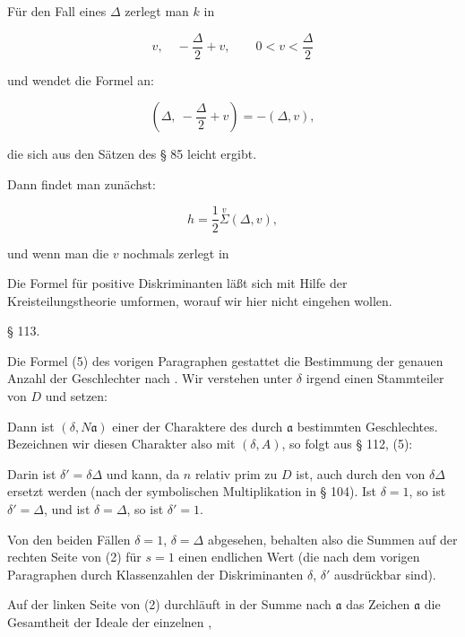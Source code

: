 Für den Fall eines  $\Delta$ zerlegt man $k$ in

\[
v, \quad -\frac{\Delta}{2} + v, \qquad 0 < v < \frac{\Delta}{2}
\]

und wendet die Formel an:

\[
\left(\Delta,\ -\frac{\Delta}{2} + v\right) = -(\Delta,v),
\]

die sich aus den Sätzen des § 85 leicht ergibt.

Dann findet man zunächst:

\[
h = \frac{1}{2}\overset{v}{\Sigma}(\Delta,v),
\]

und wenn man die $v$ nochmals zerlegt in


Die Formel für positive Diskriminanten läßt sich mit Hilfe
der Kreisteilungstheorie umformen, worauf wir hier nicht eingehen
wollen.

\begin{center}
§ 113.\quad {}
\end{center}

Die Formel (5) des vorigen Paragraphen gestattet die Bestimmung
 der genauen Anzahl der Geschlechter nach .
Wir verstehen unter $\delta$ irgend einen Stammteiler von $D$ und setzen:


Dann ist $(\delta,N\mathfrak{a})$ einer der Charaktere des durch $\mathfrak{a}$ bestimmten
Geschlechtes. Bezeichnen wir diesen Charakter also mit $(\delta,A)$,
so folgt aus § 112, (5):


Darin ist $\delta' = \delta\Delta$ und kann, da $n$ relativ prim zu $D$ ist,
auch durch den  von $\delta\Delta$ ersetzt werden (nach der symbolischen
 Multiplikation in § 104). Ist $\delta = 1$, so ist $\delta' = \Delta$,
und ist $\delta = \Delta$, so ist $\delta' = 1$.

Von den beiden Fällen $\delta = 1$, $\delta = \Delta$ abgesehen, behalten
also die Summen auf der rechten Seite von (2) für $s = 1$ einen
endlichen Wert (die nach dem vorigen Paragraphen durch Klassenzahlen
 der Diskriminanten $\delta$, $\delta'$ ausdrückbar sind).

Auf der linken Seite von (2) durchläuft in der Summe nach $\mathfrak{a}$
das Zeichen $\mathfrak{a}$ die Gesamtheit der Ideale der einzelnen ,
